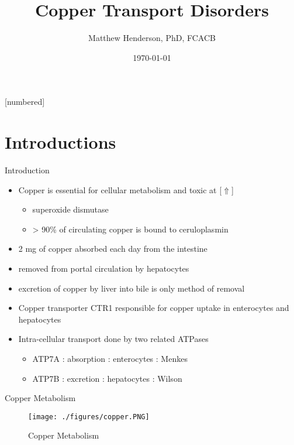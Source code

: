 \documentclass[presentation, smaller]{beamer}
\author{Matthew Henderson, PhD, FCACB}
\date{\today}
\title{Copper Transport Disorders}
\institute[NSO]{Newborn Screening Ontario | The University of Ottawa}
\begin{document}
\maketitle


\vspace{220pt}
\beamertemplatenavigationsymbolsempty
{}[numbered]

\section{Introductions}
\label{sec:orgf8eb4c1}
\begin{frame}[label={sec:org2a95cf6}]{Introduction}
\begin{itemize}
\item Copper is essential for cellular metabolism and toxic at [\(\Uparrow\)]
\begin{itemize}
\item superoxide dismutase
\item > 90\% of circulating copper is bound to ceruloplasmin
\end{itemize}
\item 2 mg of copper absorbed each day from the intestine
\item removed from portal circulation by hepatocytes
\item excretion of copper by liver into bile is only method of removal
\item Copper transporter CTR1 responsible for copper uptake in enterocytes and hepatocytes
\item Intra-cellular transport done by two related ATPases
\begin{itemize}
\item ATP7A : absorption : enterocytes : Menkes
\item ATP7B : excretion : hepatocytes : Wilson
\end{itemize}
\end{itemize}
\end{frame}

\begin{frame}[label={sec:org6653d3c}]{Copper Metabolism}
\begin{figure}[htbp]
\centering
\texttt{[image: ./figures/copper.PNG]}
\caption[copper]{\label{fig:orgb2773d4}
Copper Metabolism}
\end{figure}
\end{frame}
\end{document}
